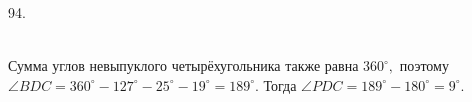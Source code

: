 94. \begin{figure}[ht!]
\end{figure}\\
Сумма углов невыпуклого четырёхугольника также равна $360^\circ,$ поэтому $\angle BDC=360^\circ-127^\circ-25^\circ-19^\circ=189^\circ.$ Тогда $\angle PDC=189^\circ-180^\circ=9^\circ.$\\
